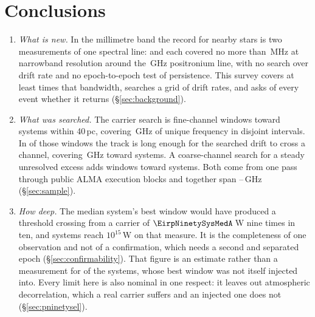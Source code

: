 \section{Conclusions}
\label{sec:conclusions}

\begin{enumerate}[leftmargin=1.6em,itemsep=4pt,topsep=4pt,parsep=0pt]

\item \emph{What is new.} In the millimetre band the record for nearby stars
is two measurements of one spectral line: \citet{Steffes1994} and
\citet{Mauersberger1996} each covered no more than \SbPriorBandMHz\,MHz at
narrowband resolution around the \SbPriorFreqGHz\,GHz positronium line, with
no search over drift rate and
no epoch-to-epoch test of persistence. This survey covers at
least \SbPriorRatio{} times that bandwidth, searches a grid of drift rates,
and asks of every event whether it returns (\S\ref{sec:background}).

\item \emph{What was searched.} The carrier search is \NWinA{} fine-channel
windows toward \NSysClassA{} systems within 40\,pc, covering \CvUnionA\,GHz
of unique frequency in \CovNIslands{} disjoint intervals. In \EdrNWinA{} of
those windows the track is long enough for the searched drift to cross a
channel, covering \EdrUnionGHz\,GHz toward \EdrNSys{} systems. A coarse-channel
search for a steady unresolved excess adds \NWinB{} windows toward
\PrSysClassB{} systems. Both come from one pass through \NEB{} public ALMA
execution blocks and together span \SurvFreqLo--\SurvFreqHi\,GHz
(\S\ref{sec:sample}).

\item \emph{How deep.} The median system's best window would have produced a
threshold crossing from a carrier of $\EirpNinetySysMedA$\,W nine times in
ten, and \NSysEfifteen{} systems reach $10^{15}$\,W on that measure. It is the
completeness of one observation and not of a confirmation, which needs a
second and separated epoch (\S\ref{sec:confirmability}). That figure is an
estimate rather than a
measurement for \SmcNEstSys{} of the \NSysClassA{} systems, whose best window
was not itself injected into. Every limit here is also nominal in one
respect: it leaves out atmospheric decorrelation, which a real carrier
suffers and an injected one does not (\S\ref{sec:pninetysel}).


\end{enumerate}
